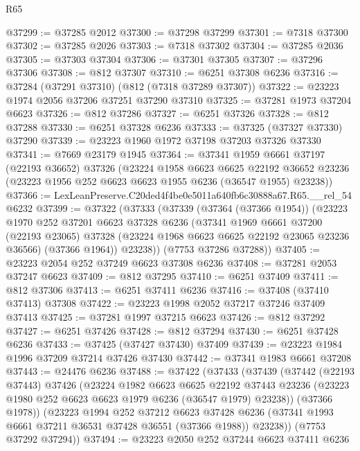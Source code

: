 \begin{lexlean}{R65}
\begin{coremodule}
{@37299 := @37285 @2012
@37300 := @37298 @37299
@37301 := @7318 @37300
@37302 := @37285 @2026
@37303 := @7318 @37302
@37304 := @37285 @2036
@37305 := @37303 @37304
@37306 := @37301 @37305
@37307 := @37296 @37306
@37308 := @812 @37307
@37310 := @6251 @37308 @6236
@37316 := @37284 (@37291 @37310) (@812 (@7318 @37289 @37307))
@37322 := @23223 @1974 @2056 @37206 @37251 @37290 @37310
@37325 := @37281 @1973 @37204 @6623
@37326 := @812 @37286
@37327 := @6251 @37326
@37328 := @812 @37288
@37330 := @6251 @37328 @6236
@37333 := @37325 (@37327 @37330) @37290
@37339 := @23223 @1960 @1972 @37198 @37203 @37326 @37330
@37341 := @7669 @23179 @1945
@37364 := @37341
    @1959
    @6661
    @37197
    (@22193 @36652)
    @37326
    (@23224
      @1958
      @6623
      @6625
      @22192
      @36652
      @23236
      (@23223 @1956 @252 @6623 @6623 @1955 @6236 (@36547 @1955) @23238))
@37366 := LexLeanPreserve.C20ded4f4be0e5011a640fb6c30888a67.R65.__rel_54 @6232
@37399 := @37322
    (@37333
      (@37339
        (@37364 (@37366 @1954))
        (@23223
          @1970
          @252
          @37201
          @6623
          @37328
          @6236
          (@37341
            @1969
            @6661
            @37200
            (@22193 @23065)
            @37328
            (@23224 @1968 @6623 @6625 @22192 @23065 @23236 @36566)
            (@37366 @1964))
          @23238))
      (@7753 @37286 @37288))
@37405 := @23223 @2054 @252 @37249 @6623 @37308 @6236
@37408 := @37281 @2053 @37247 @6623
@37409 := @812 @37295
@37410 := @6251 @37409
@37411 := @812 @37306
@37413 := @6251 @37411 @6236
@37416 := @37408 (@37410 @37413) @37308
@37422 := @23223 @1998 @2052 @37217 @37246 @37409 @37413
@37425 := @37281 @1997 @37215 @6623
@37426 := @812 @37292
@37427 := @6251 @37426
@37428 := @812 @37294
@37430 := @6251 @37428 @6236
@37433 := @37425 (@37427 @37430) @37409
@37439 := @23223 @1984 @1996 @37209 @37214 @37426 @37430
@37442 := @37341 @1983 @6661 @37208
@37443 := @24476 @6236
@37488 := @37422
    (@37433
      (@37439
        (@37442
          (@22193 @37443)
          @37426
          (@23224
            @1982
            @6623
            @6625
            @22192
            @37443
            @23236
            (@23223 @1980 @252 @6623 @6623 @1979 @6236 (@36547 @1979) @23238))
          (@37366 @1978))
        (@23223
          @1994
          @252
          @37212
          @6623
          @37428
          @6236
          (@37341 @1993 @6661 @37211 @36531 @37428 @36551 (@37366 @1988))
          @23238))
      (@7753 @37292 @37294))
@37494 := @23223 @2050 @252 @37244 @6623 @37411 @6236
}
\end{coremodule}
\end{lexlean}
